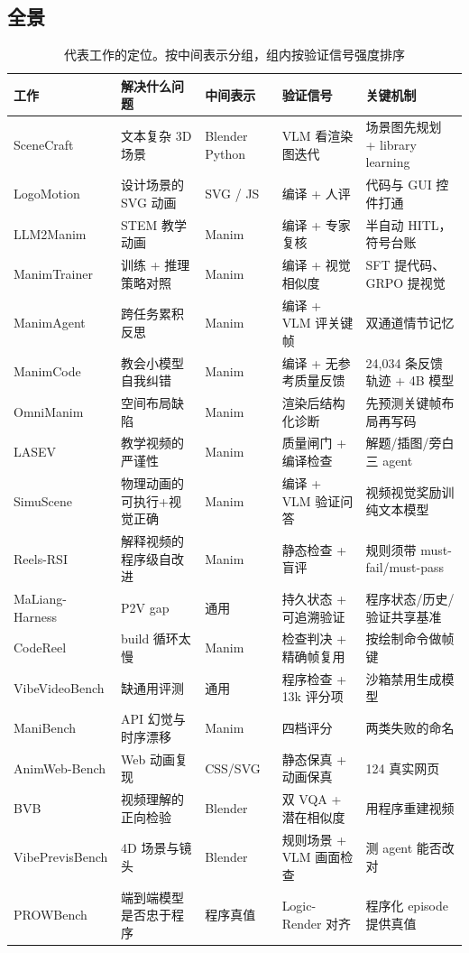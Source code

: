 \subsection{全景}

\begin{table}[t]
\centering
\footnotesize
\setlength{\tabcolsep}{4pt}
\caption{代表工作的定位。按中间表示分组，组内按验证信号强度排序}
\label{tab:2}
\begin{tabularx}{\textwidth}{llllX}
\toprule
工作 & 解决什么问题 & 中间表示 & 验证信号 & 关键机制 \\
\midrule
SceneCraft & 文本\sym{→}{}复杂 3D 场景 & Blender Python & VLM 看渲染图迭代 & 场景图先规划 + library learning \\
LogoMotion & 设计场景的 SVG 动画 & SVG / JS & 编译 + 人评 & 代码与 GUI 控件打通 \\
LLM2Manim & STEM 教学动画 & Manim & 编译 + 专家复核 & 半自动 HITL，符号台账 \\
ManimTrainer & 训练 + 推理策略对照 & Manim & 编译 + 视觉相似度 & SFT 提代码、GRPO 提视觉 \\
ManimAgent & 跨任务累积反思 & Manim & 编译 + VLM 评关键帧 & 双通道情节记忆 \\
ManimCode & 教会小模型自我纠错 & Manim & 编译 + 无参考质量反馈 & 24,034 条反馈轨迹 + 4B 模型 \\
OmniManim & 空间布局缺陷 & Manim & 渲染后结构化诊断 & 先预测关键帧布局再写码 \\
LASEV & 教学视频的严谨性 & Manim & 质量闸门 + 编译检查 & 解题/插图/旁白三 agent \\
SimuScene & 物理动画的可执行+视觉正确 & Manim & 编译 + VLM 验证问答 & 视频视觉奖励训纯文本模型 \\
Reels-RSI & 解释视频的程序级自改进 & Manim & 静态检查 + 盲评 & 规则须带 must-fail/must-pass \\
MaLiang-Harness & P2V gap & 通用 & 持久状态 + 可追溯验证 & 程序状态/历史/验证共享基准 \\
CodeReel & build 循环太慢 & Manim & 检查判决 + 精确帧复用 & 按绘制命令做帧键 \\
VibeVideoBench & 缺通用评测 & 通用 & 程序检查 + 13k 评分项 & 沙箱禁用生成模型 \\
ManiBench & API 幻觉与时序漂移 & Manim & 四档评分 & 两类失败的命名 \\
AnimWeb-Bench & Web 动画复现 & CSS/SVG & 静态保真 + 动画保真 & 124 真实网页 \\
BVB & 视频理解的正向检验 & Blender & 双 VQA + 潜在相似度 & 用程序重建视频 \\
VibePrevisBench & 4D 场景与镜头 & Blender & 规则场景 + VLM 画面检查 & 测 agent 能否改对 \\
PROWBench & 端到端模型是否忠于程序 & 程序真值 & Logic-Render 对齐 & 程序化 episode 提供真值 \\
\bottomrule
\end{tabularx}
\end{table}

